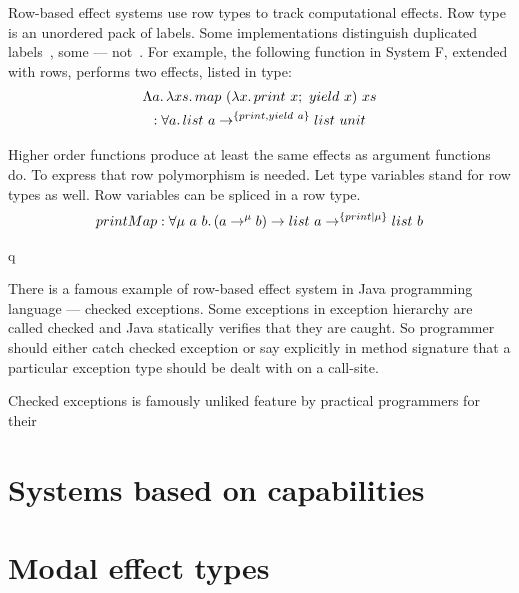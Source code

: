 \documentclass[conference]{IEEEtran}
\newcommand{\seq}{;~}
\newcommand{\ap}{~}
\begin{document}
    Row-based effect systems use row types to track computational effects.
    Row type is an unordered pack of labels.
    Some implementations distinguish duplicated labels~\cite{koka}, some --- not~\cite{links}.
    For example, the following function in System F, extended with rows, performs two effects, listed in type:
    \begin{multline*}
        \Lambda a\ldotp\lambda xs\ldotp map \ap (\lambda x\ldotp print\ap x\seq yield\ap x) \ap xs \\ : \forall a \ldotp list\ap a \to^{\{print, yield \ap a\}} list \ap unit
    \end{multline*}

    Higher order functions produce at least the same effects as argument functions do.
    To express that row polymorphism is needed.
    Let type variables stand for row types as well.
    Row variables can be spliced in a row type.
    \begin{multline*}
        printMap : \forall \mu \ap a \ap b\ldotp (a \to^\mu b) \to list \ap a \to^{\{print|\mu\}} list \ap b
    \end{multline*}


    q\cite{koka}\cite{links}

    There is a famous example of row-based effect system in Java programming language --- checked exceptions.
    Some exceptions in exception hierarchy are called checked and Java statically verifies that they are caught.
    So programmer should either catch checked exception or say explicitly in method signature that a particular exception type should be dealt with on a call-site.


    Checked exceptions is famously unliked feature by practical programmers for their







    \section{Systems based on capabilities}




    \section{Modal effect types}
\end{document}
